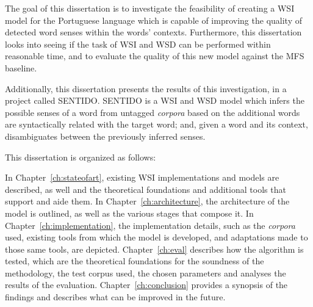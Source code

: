
The goal of this dissertation is to investigate the feasibility of creating a
\ac{WSI} model for the Portuguese language which is capable of improving the
quality of detected word senses within the words' contexts. Furthermore, this
dissertation looks into seeing if the task of \ac{WSI} and \ac{WSD} can be
performed within reasonable time, and to evaluate the quality of this new model
against the \ac{MFS} baseline.


Additionally, this dissertation presents the results of this investigation, in
a project called \ac{SENTIDO}. \ac{SENTIDO} is a \ac{WSI} and \ac{WSD} model
which infers the possible senses of a word from untagged \emph{corpora} based
on the additional words are syntactically related with the target word; and,
given a word and its context, disambiguates between the previously inferred
senses.


This dissertation is organized as follows:

In Chapter~\ref{ch:stateofart}, existing \ac{WSI} implementations and models
are described, as well and the theoretical foundations and additional tools
that support and aide them. In Chapter~\ref{ch:architecture}, the architecture
of the model is outlined, as well as the various stages that compose it. In
Chapter~\ref{ch:implementation}, the implementation details, such as the
\emph{corpora} used, existing tools from which the model is developed, and
adaptations made to those same tools, are depicted.
Chapter~\ref{ch:eval} describes how the algorithm is tested, which are the
theoretical foundations for the soundness of the methodology, the test corpus
used, the chosen parameters and analyses the results of the evaluation.
Chapter~\ref{ch:conclusion} provides a synopsis of the findings and describes
what can be improved in the future.

